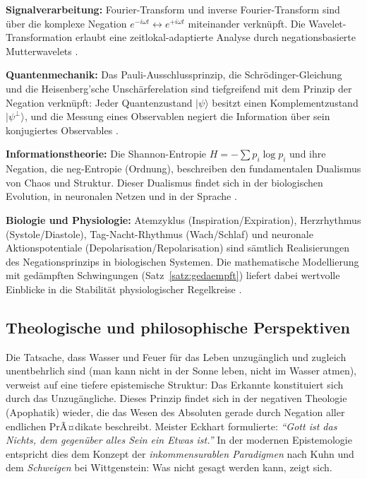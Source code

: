 ﻿\documentclass[a4paper,12pt]{article}
\theoremstyle{definition}
\begin{document}
\textbf{Signalverarbeitung:} Fourier-Transform und inverse Fourier-Transform
sind \"uber die komplexe Negation $e^{-i\omega t} \leftrightarrow e^{+i\omega t}$
miteinander verkn\"upft. Die Wavelet-Transformation erlaubt eine
zeitlokal-adaptierte Analyse durch negationsbasierte Mutterwavelets \cite{Mallat1999}.

\textbf{Quantenmechanik:} Das Pauli-Ausschlussprinzip, die Schr\"odinger-Gleichung
und die Heisenberg'sche Unsch\"arferelation sind tiefgreifend mit dem Prinzip der
Negation verkn\"upft: Jeder Quantenzustand $|\psi\rangle$ besitzt einen
Komplementzustand $|\psi^\perp\rangle$, und die Messung eines Observablen negiert
die Information \"uber sein konjugiertes Observables \cite{Dirac1958}.

\textbf{Informationstheorie:} Die Shannon-Entropie $H = -\sum p_i \log p_i$ und
ihre Negation, die neg-Entropie (Ordnung), beschreiben den fundamentalen Dualismus
von Chaos und Struktur. Dieser Dualismus findet sich in der biologischen Evolution,
in neuronalen Netzen und in der Sprache \cite{Shannon1948}.

\textbf{Biologie und Physiologie:} Atemzyklus (Inspiration/Expiration), Herzrhythmus
(Systole/Diastole), Tag-Nacht-Rhythmus (Wach/Schlaf) und neuronale Aktionspotentiale
(Depolarisation/Repolarisation) sind s\"amtlich Realisierungen des Negationsprinzips
in biologischen Systemen. Die mathematische Modellierung mit ged\"ampften Schwingungen
(Satz~\ref{satz:gedaempft}) liefert dabei wertvolle Einblicke in die Stabilit\"at
physiologischer Regelkreise \cite{Murray2002}.

\subsection{Theologische und philosophische Perspektiven}

Die Tatsache, dass Wasser und Feuer f\"ur das Leben unzug\"anglich und zugleich
unentbehrlich sind (man kann nicht in der Sonne leben, nicht im Wasser atmen),
verweist auf eine tiefere epistemische Struktur: Das Erkannte konstituiert sich
durch das Unzug\"angliche. Dieses Prinzip findet sich in der negativen Theologie
(Apophatik) wieder, die das Wesen des Absoluten gerade durch Negation aller
endlichen PrÃ¤dikate beschreibt. Meister Eckhart formulierte: \emph{``Gott ist das
Nichts, dem gegen\"uber alles Sein ein Etwas ist.''} In der modernen Epistemologie
entspricht dies dem Konzept der \emph{inkommensurablen Paradigmen} nach Kuhn und
dem \emph{Schweigen} bei Wittgenstein: Was nicht gesagt werden kann, zeigt sich.
\end{document}
